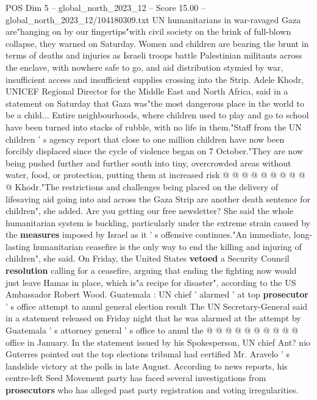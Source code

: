 \begin{textsample}{POS Dim 5 – global\_north\_2023\_12 – Score 15.00 – global\_north\_2023\_12/104180309.txt}  \label{ex:f5_pos_343}
UN humanitarians in war-ravaged Gaza are"hanging on by our fingertips"with civil society on the brink of full-blown collapse, they warned on Saturday.
Women and children are bearing the brunt in terms of deaths and injuries as Israeli troops battle Palestinian militants across the enclave, with nowhere safe to go, and aid distribution stymied by war, insufficient access and insufficient supplies crossing into the Strip.
Adele Khodr, UNICEF Regional Director for the Middle East and North Africa, said in a statement on Saturday that Gaza was"the most dangerous place in the world to be a child...
Entire neighbourhoods, where children used to play and go to school have been turned into stacks of rubble, with no life in them."Staff from the UN children ' s agency report that close to one million children have now been forcibly displaced since the cycle of violence began on 7 October."They are now being pushed further and further south into tiny, overcrowded areas without water, food, or protection, putting them at increased risk @ @ @ @ @ @ @ @ @ @ Khodr."The restrictions and challenges being placed on the delivery of lifesaving aid going into and across the Gaza Strip are another death sentence for children", she added.
Are you getting our free newsletter?
She said the whole humanitarian system is buckling, particularly under the extreme strain caused by the \textbf{measures} imposed by Israel as it ' s offensive continues."An immediate, long-lasting humanitarian ceasefire is the only way to end the killing and injuring of children", she said.
On Friday, the United States \textbf{vetoed} a Security Council \textbf{resolution} calling for a ceasefire, arguing that ending the fighting now would just leave Hamas in place, which is"a recipe for disaster", according to the US Ambassador Robert Wood.
Guatemala : UN chief ' alarmed ' at top \textbf{prosecutor} ' s office attempt to annul general election result The UN Secretary-General said in a statement released on Friday night that he was alarmed at the attempt by Guatemala ' s attorney general ' s office to annul the @ @ @ @ @ @ @ @ @ @ office in January.
In the statement issued by his Spokesperson, UN chief Ant? nio Guterres pointed out the top elections tribunal had certified Mr.
Aravelo ' s landslide victory at the polls in late August.
According to news reports, his centre-left Seed Movement party has faced several investigations from \textbf{prosecutors} who has alleged past party registration and voting irregularities.

\end{textsample}
